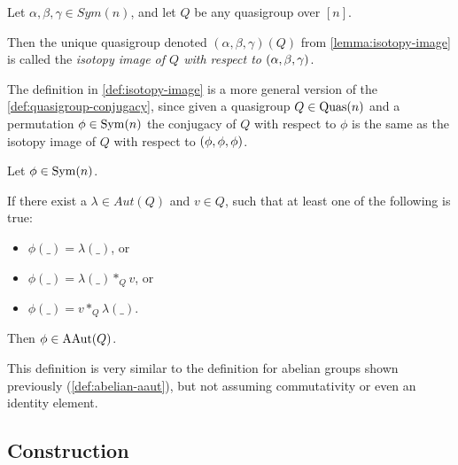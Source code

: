 \begin{definition} \label{def:isotopy-image}
    Let \( \alpha, \beta, \gamma \in Sym(n) \), and let \( Q \) be any quasigroup over \( [n] \).

    Then the unique quasigroup denoted \( (\alpha, \beta, \gamma)(Q) \) from \autoref{lemma:isotopy-image} is called the \emph{isotopy image of \( Q \) with respect to \( \left( \alpha, \beta, \gamma \right) \)}.
\end{definition}

\begin{remark}
    The definition in \autoref{def:isotopy-image} is a more general version of the \autoref{def:quasigroup-conjugacy}, since given a quasigroup \( Q \in \operatorname{Quas}(n) \) and a permutation \( \phi \in \operatorname{Sym}(n) \) the conjugacy of \( Q \) with respect to \( \phi \) is the same as the isotopy image of \( Q \) with respect to \( \left( \phi, \phi, \phi \right) \).
\end{remark}

\begin{definition}
    Let \( \phi \in \operatorname{Sym}(n) \).
    
    If there exist a \( \lambda \in Aut(Q) \) and \( v \in Q \), such that at least one of the following is true:
    \begin{itemize}
        \item \( \phi(\_) = \lambda(\_) \), or
        \item \( \phi(\_) = \lambda(\_) *_Q v \), or
        \item \( \phi(\_) = v *_Q \lambda(\_) \).
    \end{itemize}

    Then \( \phi \in \operatorname{AAut}(Q) \).
\end{definition}
\begin{remark}
    This definition is very similar to the definition for abelian groups shown previously (\autoref{def:abelian-aaut}), but not assuming commutativity or even an identity element.
\end{remark}

\subsection{Construction}

